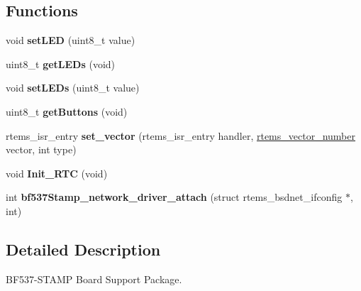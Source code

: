 \subsection*{Functions}
\begin{DoxyCompactItemize}
\item 
\mbox{\label{group__RTEMSBSPsBfinBF537Stamp_ga110e01eabf1f71f15a4d12a32778a524}} 
void {\bfseries set\+L\+ED} (uint8\+\_\+t value)
\item 
\mbox{\label{group__RTEMSBSPsBfinBF537Stamp_ga1e257d8cbb6cebe5e3d4261d784da883}} 
uint8\+\_\+t {\bfseries get\+L\+E\+Ds} (void)
\item 
\mbox{\label{group__RTEMSBSPsBfinBF537Stamp_ga933aad7016ca6cd1d9eec7d936616435}} 
void {\bfseries set\+L\+E\+Ds} (uint8\+\_\+t value)
\item 
\mbox{\label{group__RTEMSBSPsBfinBF537Stamp_gad299d8045aa86a4cf0833eb60a9d01e9}} 
uint8\+\_\+t {\bfseries get\+Buttons} (void)
\item 
\mbox{\label{group__RTEMSBSPsBfinBF537Stamp_gab3388042c56b34c40be81fd5f028d97e}} 
rtems\+\_\+isr\+\_\+entry {\bfseries set\+\_\+vector} (rtems\+\_\+isr\+\_\+entry handler, \mbox{\hyperlink{group__ClassicINTR_ga3e434c197d99f128e78cae4d9358bd8b}{rtems\+\_\+vector\+\_\+number}} vector, int type)
\item 
\mbox{\label{group__RTEMSBSPsBfinBF537Stamp_ga715337dfa6294a1b8c668475ccf0b1f2}} 
void {\bfseries Init\+\_\+\+R\+TC} (void)
\item 
\mbox{\label{group__RTEMSBSPsBfinBF537Stamp_ga4868ba908ef0832754f48778e416c5c8}} 
int {\bfseries bf537\+Stamp\+\_\+network\+\_\+driver\+\_\+attach} (struct rtems\+\_\+bsdnet\+\_\+ifconfig $\ast$, int)
\end{DoxyCompactItemize}


\subsection{Detailed Description}
B\+F537-\/\+S\+T\+A\+MP Board Support Package. 



